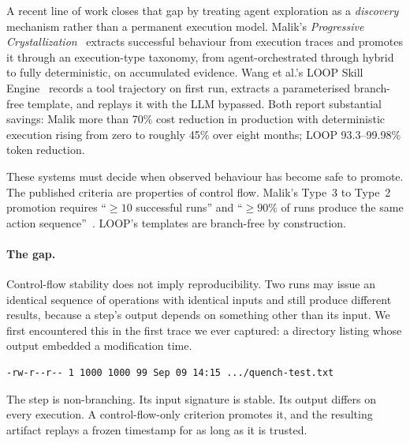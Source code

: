 \documentclass[10pt,conference]{article}
\begin{document}
A recent line of work closes that gap by treating agent exploration as a
\emph{discovery} mechanism rather than a permanent execution model. Malik's
\emph{Progressive Crystallization}~\cite{malik2026} extracts successful
behaviour from execution traces and promotes it through an execution-type
taxonomy, from agent-orchestrated through hybrid to fully deterministic, on
accumulated evidence. Wang et al.'s LOOP Skill Engine~\cite{loop2026} records a
tool trajectory on first run, extracts a parameterised branch-free template, and
replays it with the LLM bypassed. Both report substantial savings: Malik more
than 70\% cost reduction in production with deterministic execution rising from
zero to roughly 45\% over eight months; LOOP 93.3--99.98\% token reduction.

These systems must decide when observed behaviour has become safe to promote.
The published criteria are properties of control flow. Malik's Type~3 to Type~2
promotion requires ``$\geq 10$ successful runs'' and ``$\geq 90\%$ of runs
produce the same action sequence''~\cite[Table II]{malik2026}. LOOP's templates
are branch-free by construction.

\paragraph{The gap.} Control-flow stability does not imply reproducibility. Two
runs may issue an identical sequence of operations with identical inputs and
still produce different results, because a step's output depends on something
other than its input. We first encountered this in the first trace we ever
captured: a directory listing whose output embedded a modification time.

\begin{lstlisting}
-rw-r--r-- 1 1000 1000 99 Sep 09 14:15 .../quench-test.txt
\end{lstlisting}

\figSequenceVsValue{}

\noindent The step is non-branching. Its input signature is stable. Its output
differs on every execution. A control-flow-only criterion promotes it, and the
resulting artifact replays a frozen timestamp for as long as it is trusted.
\end{document}
